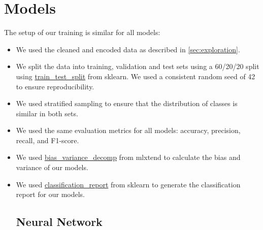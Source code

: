 \section{Models}

The setup of our training is similar for all models:
\begin{itemize}
\item We used the cleaned and encoded data as described in \ref{sec:exploration}.
\item We split the data into training, validation and test sets using a 60/20/20 split using \href{https://scikit-learn.org/stable/modules/generated/sklearn.model_selection.train_test_split.html}{train\_test\_split} from sklearn. We used a consistent random seed of 42 to ensure reproducibility.
\item We used stratified sampling to ensure that the distribution of classes is similar in both sets.
\item We used the same evaluation metrics for all models: accuracy, precision, recall, and F1-score.
\item We used \href{https://rasbt.github.io/mlxtend/user_guide/evaluate/bias_variance_decomp/}{bias\_variance\_decomp} from mlxtend to calculate the bias and variance of our models.
\item We used \href{https://scikit-learn.org/stable/modules/generated/sklearn.metrics.classification_report.html}{classification\_report} from sklearn to generate the classification report for our models.

\subsection{Neural Network}


\end{itemize}
